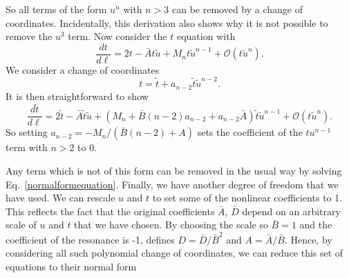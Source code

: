 \documentclass[
 reprint,
 amsmath,amssymb,
 aps, superscriptaddress, pre
]{revtex4-1}
\begin{document}
So all terms of the form $u^n$ with $n > 3$ can be removed by a change of coordinates. Incidentally, this derivation also shows why it is not possible to remove the $u^3$ term. Now consider the $t$ equation with
\begin{equation}
 \frac{dt}{d \ell} = 2 t - \bar{A} t \tilde u + M_n t \tilde u^{n-1} + \mathcal{O} (t \tilde u^{n}) .
\end{equation}
We consider a change of coordinates
\begin{equation}
 t = \tilde t + a_{n-2} \tilde t \tilde{u}^{n-2} .
\end{equation}
It is then straightforward to show
\begin{equation}
 \frac{d \tilde t}{d \ell} = 2 \tilde t - \bar{A} \tilde t \tilde u + (M_n + \bar{B} (n-2) a_{n-2} + a_{n-2} \bar{A}) \tilde t \tilde u^{n-1} + \mathcal{O} (t \tilde u^{n}) .
\end{equation}
So setting $a_{n-2} = - M_n/(\bar{B}(n-2) + A)$ sets the coefficient of the $t u^{n-1}$ term with $n > 2$ to 0. 

Any term which is not of this form can be removed in the usual way by solving Eq.~\ref{normalformequation}. Finally, we have another degree of freedom that we have used. We can rescale $u$ and $t$ to set some of the nonlinear coefficients to 1. This reflects the fact that the original coefficients $\bar{A}$, $\bar{D}$ depend on an arbitrary scale of $u$ and $t$ that we have chosen. By choosing the scale so $\bar{B} = 1$ and the coefficient of the resonance is -1, defines $D = \bar{D}/\bar{B}^2$ and $A = \bar{A}/\bar{B}$. Hence, by considering all such polynomial change of coordinates, we can reduce this set of equations to their normal form 




\end{document}
